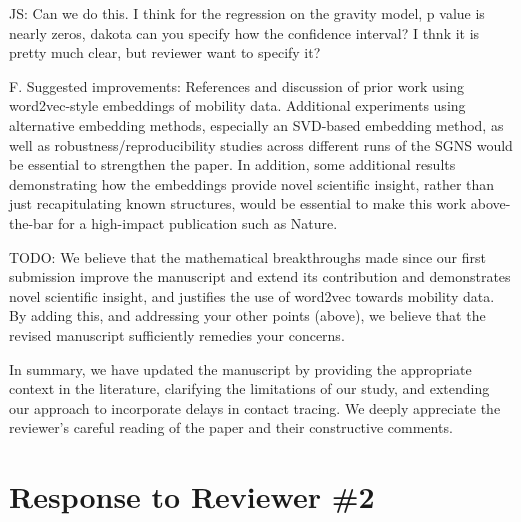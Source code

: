 \documentclass[12pt,a4paper]{article}
\newcommand{\response}[1]{{\leavevmode\noindent #1}}
\newcommand{\rcomment}[1]{%
\vspace{10pt}
\begin{tcolorbox}[colback=black!3,colframe=white!45!black]
#1
\end{tcolorbox}
}
\begin{document}
\response{%
JS: Can we do this. I think for the regression on the gravity model, p value is nearly zeros, dakota can you specify how the confidence interval? I thnk it is pretty much clear, but reviewer want to specify it?
}


\rcomment{%
F. Suggested improvements:
References and discussion of prior work using word2vec-style embeddings of mobility data.
Additional experiments using alternative embedding methods, especially an SVD-based embedding method, as well as robustness/reproducibility studies across different runs of the SGNS would be essential to strengthen the paper.
In addition, some additional results demonstrating how the embeddings provide novel scientific insight, rather than just recapitulating known structures, would be essential to make this work above-the-bar for a high-impact publication such as Nature.

}


\response{
TODO: We believe that the mathematical breakthroughs made since our first submission improve the manuscript and extend its contribution and demonstrates novel scientific insight, and justifies the use of word2vec towards mobility data. By adding this, and addressing your other points (above), we believe that the revised manuscript sufficiently remedies your concerns. 

}

\bigskip
\response{%
In summary, we have updated the manuscript by providing the appropriate context in the literature, clarifying the limitations of our study, and extending our approach to incorporate delays in contact tracing. We deeply appreciate the reviewer's careful reading of the paper and their constructive comments. 
}


\newpage

\bigskip
\section*{\bf Response to Reviewer \#2}
\end{document}

